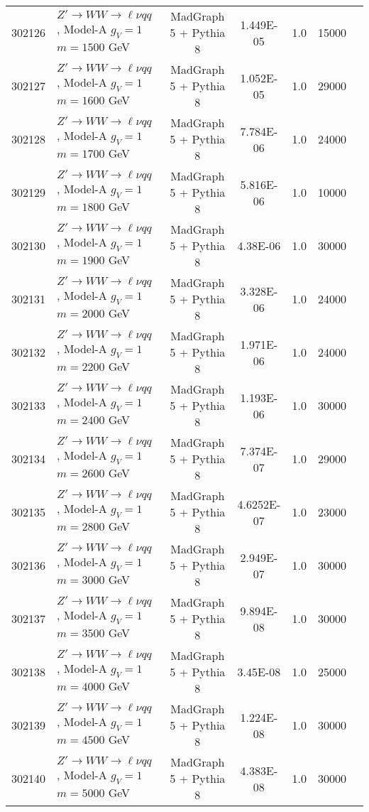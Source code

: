 \begin{landscape}
\begin{table}[!htb]
\begin{footnotesize}
\begin{center}
\begin{tabular}{c|l|c|c|c|cr}
	302126 & $Z' \to WW \to \ell\nu qq $ , Model-A $g_V=1$ $m=1500$ GeV& MadGraph 5 + Pythia 8 & 1.449E-05  &1.0& 15000 \\
	302127 & $Z' \to WW \to \ell\nu qq $ , Model-A $g_V=1$ $m=1600$ GeV& MadGraph 5 + Pythia 8 & 1.052E-05  &1.0& 29000 \\
	302128 & $Z' \to WW \to \ell\nu qq $ , Model-A $g_V=1$ $m=1700$ GeV& MadGraph 5 + Pythia 8 & 7.784E-06  &1.0& 24000 \\
	302129 & $Z' \to WW \to \ell\nu qq $ , Model-A $g_V=1$ $m=1800$ GeV& MadGraph 5 + Pythia 8 & 5.816E-06  &1.0& 10000 \\
	302130 & $Z' \to WW \to \ell\nu qq $ , Model-A $g_V=1$ $m=1900$ GeV& MadGraph 5 + Pythia 8 & 4.38E-06   &1.0& 30000 \\
	302131 & $Z' \to WW \to \ell\nu qq $ , Model-A $g_V=1$ $m=2000$ GeV& MadGraph 5 + Pythia 8 & 3.328E-06  &1.0& 24000 \\
	302132 & $Z' \to WW \to \ell\nu qq $ , Model-A $g_V=1$ $m=2200$ GeV& MadGraph 5 + Pythia 8 & 1.971E-06  &1.0& 24000 \\
	302133 & $Z' \to WW \to \ell\nu qq $ , Model-A $g_V=1$ $m=2400$ GeV& MadGraph 5 + Pythia 8 & 1.193E-06  &1.0& 30000 \\
	302134 & $Z' \to WW \to \ell\nu qq $ , Model-A $g_V=1$ $m=2600$ GeV& MadGraph 5 + Pythia 8 & 7.374E-07  &1.0& 29000 \\
	302135 & $Z' \to WW \to \ell\nu qq $ , Model-A $g_V=1$ $m=2800$ GeV& MadGraph 5 + Pythia 8 & 4.6252E-07 &1.0& 23000 \\
	302136 & $Z' \to WW \to \ell\nu qq $ , Model-A $g_V=1$ $m=3000$ GeV& MadGraph 5 + Pythia 8 & 2.949E-07  &1.0& 30000 \\
	302137 & $Z' \to WW \to \ell\nu qq $ , Model-A $g_V=1$ $m=3500$ GeV& MadGraph 5 + Pythia 8 & 9.894E-08  &1.0& 30000 \\
	302138 & $Z' \to WW \to \ell\nu qq $ , Model-A $g_V=1$ $m=4000$ GeV& MadGraph 5 + Pythia 8 & 3.45E-08   &1.0& 25000 \\
	302139 & $Z' \to WW \to \ell\nu qq $ , Model-A $g_V=1$ $m=4500$ GeV& MadGraph 5 + Pythia 8 & 1.224E-08  &1.0& 30000 \\
	302140 & $Z' \to WW \to \ell\nu qq $ , Model-A $g_V=1$ $m=5000$ GeV& MadGraph 5 + Pythia 8 & 4.383E-08  &1.0& 30000 \\
\hline\hline
\end{tabular}
\end{center}
\end{footnotesize}
\end{table}


\end{landscape}
